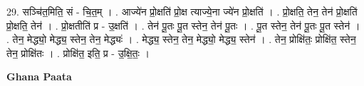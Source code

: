 \documentclass[17pt]{extarticle}
\begin{document}
29. सञ्चि॑त॒मिति॒ सं - चि॒त॒म् । . आज्ये॑न प्रो॒क्षति॑ प्रो॒क्ष त्याज्ये॒ना ज्ये॑न प्रो॒क्षति॑ । . प्रो॒क्षति॒ तेन॒ तेन॑ प्रो॒क्षति॑ प्रो॒क्षति॒ तेन॑ । . प्रो॒क्षतीति॑ प्र - उ॒क्षति॑ । . तेन॑ पू॒तः पू॒त स्तेन॒ तेन॑ पू॒तः । . पू॒त स्तेन॒ तेन॑ पू॒तः पू॒त स्तेन॑ । . तेन॒ मेद्ध्यो॒ मेद्ध्य॒ स्तेन॒ तेन॒ मेद्ध्यः॑ । . मेद्ध्य॒ स्तेन॒ तेन॒ मेद्ध्यो॒ मेद्ध्य॒ स्तेन॑ । . तेन॒ प्रोक्षि॑तः॒ प्रोक्षि॑त॒ स्तेन॒ तेन॒ प्रोक्षि॑तः । . प्रोक्षि॑त॒ इति॒ प्र - उ॒क्षि॒तः॒ । \newline

\textbf{Ghana Paata } \newline
\end{document}
